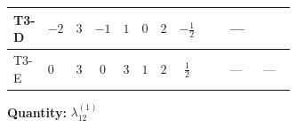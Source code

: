 \documentclass[8pt]{article}
\begin{document}
\begin{landscape}
\begin{longtable}{@{}llcccccc >{\raggedright\arraybackslash}p{0.21\linewidth} >{\raggedright\arraybackslash}p{0.21\linewidth} >{\raggedright\arraybackslash}p{0.21\linewidth}@{}}
\midrule
T3-D & $-2$ & $3$ & $-1$ & $1$ & $0$ & $2$ & $-\frac{1}{2}$ & \scriptsize\adjustbox{max width=\linewidth}{$\begin{gathered} +4 {\lambda_{HS_1}^{(1)}} {\lambda_{HS_2}^{(1)}}\end{gathered}$} & --- & \scriptsize\adjustbox{max width=\linewidth}{$\begin{gathered} +4 {\lambda_{12}^{(1)}} {\lambda_{S_1}^{(A)}}\end{gathered}$} \\
\midrule
T3-E & $0$ & $3$ & $0$ & $3$ & $1$ & $2$ & $\frac{1}{2}$ & \scriptsize\adjustbox{max width=\linewidth}{$\begin{gathered} +4 {\lambda_{HS_1}^{(1)}} {\lambda_{HS_2}^{(1)}}\end{gathered}$} & --- & --- \\
\midrule
\bottomrule
\end{longtable}
\clearpage
\noindent\textbf{Quantity: }$\lambda_{12}^{(1)}$\par\smallskip

\end{landscape}
\end{document}

